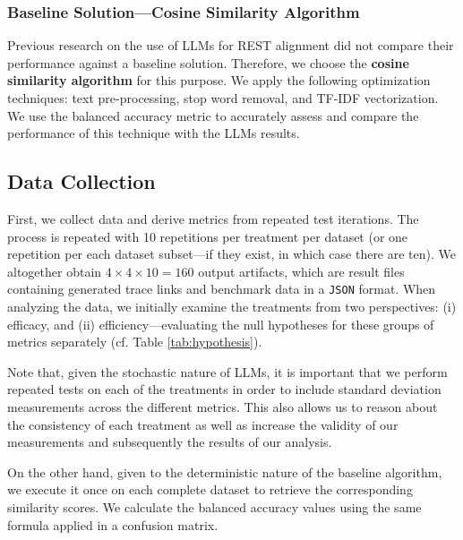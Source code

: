 \documentclass[conference]{IEEEtran}
\begin{document}
\subsubsection{Baseline Solution---Cosine Similarity Algorithm}

Previous research on the use of LLMs for REST alignment did not compare their performance against a baseline solution. Therefore, we choose the \textbf{cosine similarity algorithm} for this purpose. We apply the following optimization techniques: text pre-processing, stop word removal, and TF-IDF vectorization. We use the balanced accuracy metric to accurately assess and compare the performance of this technique with the LLMs results.

\subsection{Data Collection}\label{sec:data-collection}

First, we collect data and derive metrics from repeated test iterations. The process is repeated with 10 repetitions per treatment per dataset (or one repetition per each dataset subset---if they exist, in which case there are ten). We altogether obtain $4 \times 4 \times 10 = 160$ output artifacts, which are result files containing generated trace links and benchmark data in a \verb|JSON| format. When analyzing the data, we initially examine the treatments from two perspectives: (i) efficacy, and (ii) efficiency---evaluating the null hypotheses for these groups of metrics separately (cf. Table \ref{tab:hypothesis}).

Note that, given the stochastic nature of LLMs, it is important that we perform repeated tests on each of the treatments in order to include standard deviation measurements across the different metrics. This also allows us to reason about the consistency of each treatment as well as increase the validity of our measurements and subsequently the results of our analysis.

On the other hand, given to the deterministic nature of the baseline algorithm, we execute it once on each complete dataset to retrieve the corresponding similarity scores. We calculate the balanced accuracy values using the same formula applied in a confusion matrix.


\end{document}
